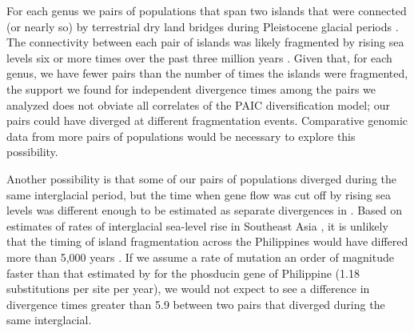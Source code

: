 For each genus we   pairs of populations that span two
islands that were connected (or nearly so) by terrestrial dry land bridges
during Pleistocene glacial periods
.
The connectivity between each pair of islands was likely fragmented by rising
sea levels six or more times over the past three million years
\citep{Rohling1998,Siddall2003}.
Given that, for each genus, we have fewer pairs than the number of times the
islands were fragmented,
the support we found for independent divergence times among the pairs we
analyzed does not obviate all correlates of the PAIC diversification model;
our pairs could have diverged at different fragmentation events.
Comparative genomic data from more pairs of populations would be necessary to
explore this possibility.


Another possibility is that some of our pairs of populations diverged during
the same interglacial period, but the time when gene flow was cut off by rising
sea levels was different enough to be estimated as separate divergences in
\ecoevolity.
Based on  estimates of rates of interglacial
sea-level rise in Southeast Asia \citep{Hanebuth2000,Sathiamurthy2006}, it is
unlikely that the timing of island fragmentation across the Philippines would
have differed more than 5,000 years .
If we assume a rate of mutation an order of magnitude faster than that
estimated by \citet{Siler2012} for the phosducin gene of Philippine 
(1.18 substitutions per site per year),
we would not expect to see a difference in divergence times greater than
5.9 
between two pairs that diverged during the same interglacial.


